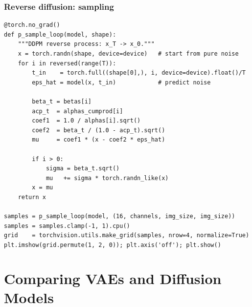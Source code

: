 \documentclass{beamer}
\begin{document}
\begin{frame}
\frametitle{Reverse diffusion: sampling}

\begin{verbatim}
@torch.no_grad()
def p_sample_loop(model, shape):
    """DDPM reverse process: x_T -> x_0."""
    x = torch.randn(shape, device=device)   # start from pure noise
    for i in reversed(range(T)):
        t_in    = torch.full((shape[0],), i, device=device).float()/T
        eps_hat = model(x, t_in)            # predict noise

        beta_t = betas[i]
        acp_t  = alphas_cumprod[i]
        coef1  = 1.0 / alphas[i].sqrt()
        coef2  = beta_t / (1.0 - acp_t).sqrt()
        mu     = coef1 * (x - coef2 * eps_hat)

        if i > 0:
            sigma = beta_t.sqrt()
            mu   += sigma * torch.randn_like(x)
        x = mu
    return x

samples = p_sample_loop(model, (16, channels, img_size, img_size))
samples = samples.clamp(-1, 1).cpu()
grid    = torchvision.utils.make_grid(samples, nrow=4, normalize=True)
plt.imshow(grid.permute(1, 2, 0)); plt.axis('off'); plt.show()
\end{verbatim}
\end{frame}

\section{Comparing VAEs and Diffusion Models}
\end{document}
